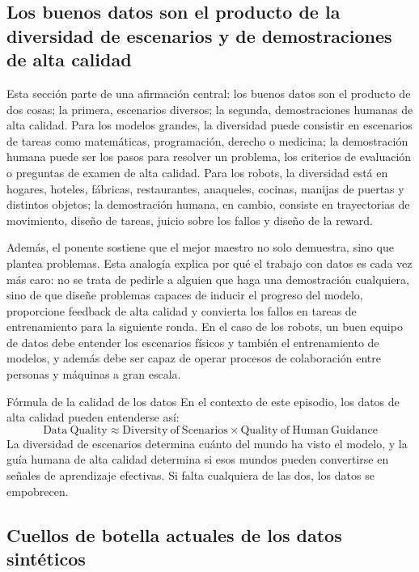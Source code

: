 \subsection{Los buenos datos son el producto de la diversidad de escenarios y de demostraciones de alta calidad}

Esta sección parte de una afirmación central: los buenos datos son el producto de dos cosas; la primera, escenarios diversos; la segunda, demostraciones humanas de alta calidad. Para los modelos grandes, la diversidad puede consistir en escenarios de tareas como matemáticas, programación, derecho o medicina; la demostración humana puede ser los pasos para resolver un problema, los criterios de evaluación o preguntas de examen de alta calidad. Para los robots, la diversidad está en hogares, hoteles, fábricas, restaurantes, anaqueles, cocinas, manijas de puertas y distintos objetos; la demostración humana, en cambio, consiste en trayectorias de movimiento, diseño de tareas, juicio sobre los fallos y diseño de la reward.

Además, el ponente sostiene que el mejor maestro no solo demuestra, sino que plantea problemas. Esta analogía explica por qué el trabajo con datos es cada vez más caro: no se trata de pedirle a alguien que haga una demostración cualquiera, sino de que diseñe problemas capaces de inducir el progreso del modelo, proporcione feedback de alta calidad y convierta los fallos en tareas de entrenamiento para la siguiente ronda. En el caso de los robots, un buen equipo de datos debe entender los escenarios físicos y también el entrenamiento de modelos, y además debe ser capaz de operar procesos de colaboración entre personas y máquinas a gran escala.

\begin{importantbox}{Fórmula de la calidad de los datos}
En el contexto de este episodio, los datos de alta calidad pueden entenderse así:
\[
\mathrm{Data\ Quality}\approx \mathrm{Diversity\ of\ Scenarios}\times \mathrm{Quality\ of\ Human\ Guidance}
\]
La diversidad de escenarios determina cuánto del mundo ha visto el modelo, y la guía humana de alta calidad determina si esos mundos pueden convertirse en señales de aprendizaje efectivas. Si falta cualquiera de las dos, los datos se empobrecen.
\end{importantbox}

\subsection{Cuellos de botella actuales de los datos sintéticos}

